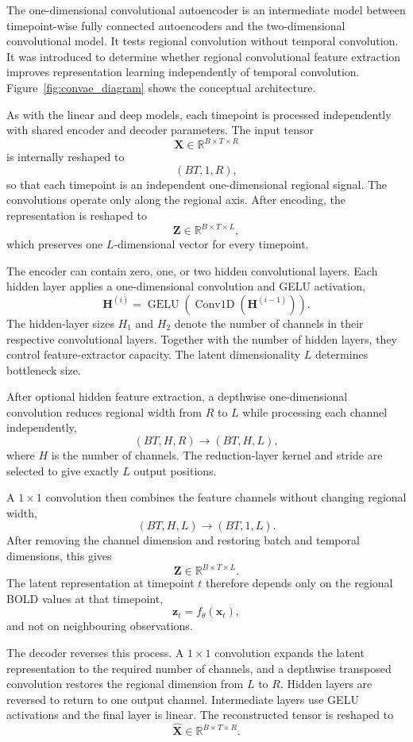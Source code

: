 The one-dimensional convolutional autoencoder is an intermediate model
between timepoint-wise fully connected autoencoders and the
two-dimensional convolutional model. It tests regional convolution
without temporal convolution. It was introduced to determine whether
regional convolutional feature extraction improves representation
learning independently of temporal convolution.
Figure~\ref{fig:convae_diagram} shows the conceptual architecture.

As with the linear and deep models, each timepoint is processed
independently with shared encoder and decoder parameters. The input
tensor
\[
\mathbf{X}\in\mathbb{R}^{B\times T\times R}
\]
is internally reshaped to
\[
(BT,1,R),
\]
so that each timepoint is an independent one-dimensional regional signal.
The convolutions operate only along the regional axis. After encoding,
the representation is reshaped to
\[
\mathbf{Z}\in\mathbb{R}^{B\times T\times L},
\]
which preserves one $L$-dimensional vector for every timepoint.

The encoder can contain zero, one, or two hidden convolutional layers.
Each hidden layer applies a one-dimensional convolution and GELU
activation,
\[
\mathbf{H}^{(i)}
=
\operatorname{GELU}
\left(
\operatorname{Conv1D}
\left(
\mathbf{H}^{(i-1)}
\right)
\right).
\]
The hidden-layer sizes $H_1$ and $H_2$ denote the number of channels in
their respective convolutional layers. Together with the number of
hidden layers, they control feature-extractor capacity. The latent
dimensionality $L$ determines bottleneck size.

After optional hidden feature extraction, a depthwise one-dimensional
convolution reduces regional width from $R$ to $L$ while processing each
channel independently,
\[
(BT,H,R)\rightarrow(BT,H,L),
\]
where $H$ is the number of channels. The reduction-layer kernel and
stride are selected to give exactly $L$ output positions.

A $1\times1$ convolution then combines the feature channels without
changing regional width,
\[
(BT,H,L)\rightarrow(BT,1,L).
\]
After removing the channel dimension and restoring batch and temporal
dimensions, this gives
\[
\mathbf{Z}\in\mathbb{R}^{B\times T\times L}.
\]
The latent representation at timepoint $t$ therefore depends only on the
regional BOLD values at that timepoint,
\[
\mathbf{z}_t=f_{\theta}(\mathbf{x}_t),
\]
and not on neighbouring observations.

The decoder reverses this process. A $1\times1$ convolution expands the
latent representation to the required number of channels, and a
depthwise transposed convolution restores the regional dimension from
$L$ to $R$. Hidden layers are reversed to return to one output channel.
Intermediate layers use GELU activations and the final layer is linear.
The reconstructed tensor is reshaped to
\[
\hat{\mathbf{X}}\in\mathbb{R}^{B\times T\times R}.
\]

